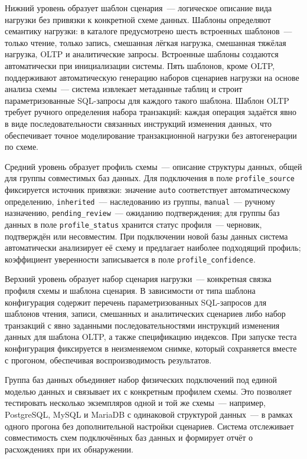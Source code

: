 Нижний уровень образует шаблон сценария~--- логическое описание вида нагрузки без привязки к конкретной схеме данных. Шаблоны определяют семантику нагрузки: в каталоге предусмотрено шесть встроенных шаблонов~--- только чтение, только запись, смешанная лёгкая нагрузка, смешанная тяжёлая нагрузка, OLTP и аналитические запросы. Встроенные шаблоны создаются автоматически при инициализации системы. Пять шаблонов, кроме OLTP, поддерживают автоматическую генерацию наборов сценариев нагрузки на основе анализа схемы~--- система извлекает метаданные таблиц и строит параметризованные SQL-запросы для каждого такого шаблона. Шаблон OLTP требует ручного определения набора транзакций: каждая операция задаётся явно в виде последовательности связанных инструкций изменения данных, что обеспечивает точное моделирование транзакционной нагрузки без автогенерации по схеме.

Средний уровень образует профиль схемы~--- описание структуры данных, общей для группы совместимых баз данных. Для подключения в поле \texttt{profile\_source} фиксируется источник привязки: значение \texttt{auto} соответствует автоматическому определению, \texttt{inherited}~--- наследованию из группы, \texttt{manual}~--- ручному назначению, \texttt{pending\_review}~--- ожиданию подтверждения; для группы баз данных в поле \texttt{profile\_status} хранится статус профиля~--- черновик, подтверждён или несовместим. При подключении новой базы данных система автоматически анализирует её схему и предлагает наиболее подходящий профиль; коэффициент уверенности записывается в поле \texttt{profile\_confidence}.

Верхний уровень образует набор сценария нагрузки~--- конкретная связка профиля схемы и шаблона сценария. В зависимости от типа шаблона конфигурация содержит перечень параметризованных SQL-запросов для шаблонов чтения, записи, смешанных и аналитических сценариев либо набор транзакций с явно заданными последовательностями инструкций изменения данных для шаблона OLTP, а также спецификацию индексов. При запуске теста конфигурация фиксируется в неизменяемом снимке, который сохраняется вместе с прогоном, обеспечивая воспроизводимость результатов.

Группа баз данных объединяет набор физических подключений под единой моделью данных и связывает их с конкретным профилем схемы. Это позволяет тестировать несколько экземпляров одной и той же схемы~--- например, PostgreSQL, MySQL и MariaDB с одинаковой структурой данных~--- в рамках одного прогона без дополнительной настройки сценариев. Система отслеживает совместимость схем подключённых баз данных и формирует отчёт о расхождениях при их обнаружении.

